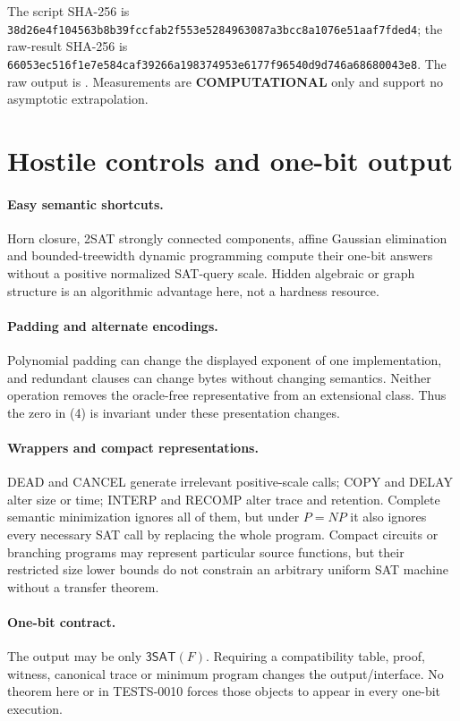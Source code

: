 \documentclass[11pt]{article}
\newcommand{\SAT}{\mathsf{3SAT}}
\newcommand{\COMP}{\textbf{COMPUTATIONAL}}
\begin{document}
The script SHA-256 is
\nolinkurl{38d26e4f104563b8b39fccfab2f553e5284963087a3bcc8a1076e51aaf7fded4};
the raw-result SHA-256 is
\nolinkurl{66053ec516f1e7e584caf39266a198374953e6177f96540d9d746a68680043e8}.
The raw output is
.
Measurements are \COMP{} only and support no asymptotic extrapolation.

\section{Hostile controls and one-bit output}

\paragraph{Easy semantic shortcuts.}
Horn closure, 2SAT strongly connected components, affine Gaussian
elimination and bounded-treewidth dynamic programming compute their one-bit
answers without a positive normalized SAT-query scale.  Hidden algebraic or
graph structure is an algorithmic advantage here, not a hardness resource.

\paragraph{Padding and alternate encodings.}
Polynomial padding can change the displayed exponent of one implementation,
and redundant clauses can change bytes without changing semantics.  Neither
operation removes the oracle-free representative from an extensional class.
Thus the zero in (4) is invariant under these presentation changes.

\paragraph{Wrappers and compact representations.}
DEAD and CANCEL generate irrelevant positive-scale calls; COPY and DELAY
alter size or time; INTERP and RECOMP alter trace and retention.  Complete
semantic minimization ignores all of them, but under $P=NP$ it also ignores
every necessary SAT call by replacing the whole program.  Compact circuits
or branching programs may represent particular source functions, but their
restricted size lower bounds do not constrain an arbitrary uniform SAT
machine without a transfer theorem.

\paragraph{One-bit contract.}
The output may be only $\SAT(F)$.  Requiring a compatibility table, proof,
witness, canonical trace or minimum program changes the output/interface.
No theorem here or in TESTS-0010 forces those objects to appear in every
one-bit execution.
\end{document}
